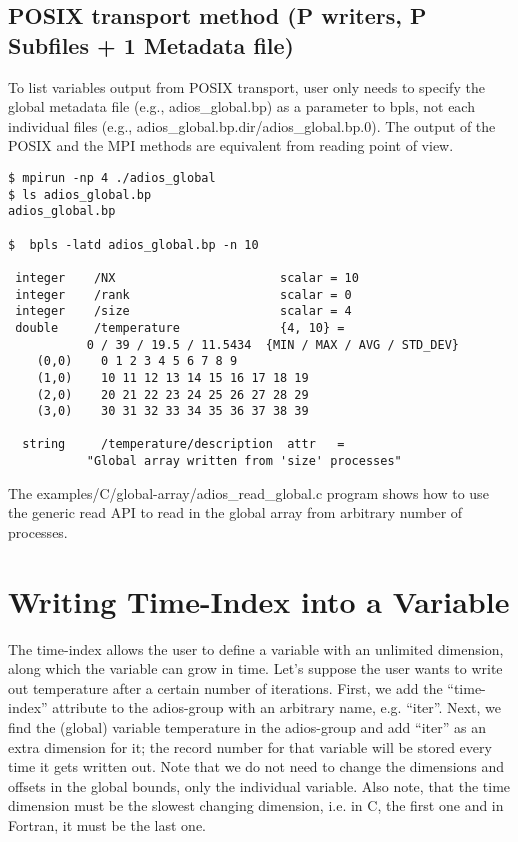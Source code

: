 \subsection{POSIX transport method (P writers, P Subfiles + 1 Metadata file)}

To list variables output from POSIX transport, user only needs to specify the global 
metadata file (e.g., adios\_global.bp) as a parameter to bpls, not each individual 
files (e.g., adios\_global.bp.dir/adios\_global.bp.0). The output of the POSIX 
and the MPI methods are equivalent from reading point of view. 

\begin{lstlisting}
$ mpirun -np 4 ./adios_global
$ ls adios_global.bp 
adios_global.bp

$  bpls -latd adios_global.bp -n 10
  
 integer    /NX                       scalar = 10
 integer    /rank                     scalar = 0
 integer    /size                     scalar = 4
 double     /temperature              {4, 10} = 
           0 / 39 / 19.5 / 11.5434  {MIN / MAX / AVG / STD_DEV}
    (0,0)    0 1 2 3 4 5 6 7 8 9
    (1,0)    10 11 12 13 14 15 16 17 18 19
    (2,0)    20 21 22 23 24 25 26 27 28 29
    (3,0)    30 31 32 33 34 35 36 37 38 39

  string     /temperature/description  attr   = 
           "Global array written from 'size' processes"

\end{lstlisting}

The examples/C/global-array/adios\_read\_global.c program shows how to use the 
generic read API to read in the global array from arbitrary number of processes. 


\section{Writing Time-Index into a Variable}

The time-index allows the user to define a variable with an unlimited dimension, 
along which the variable can grow in time. Let's suppose the user wants to write 
out temperature after a certain number of iterations. First, we add the ``time-index'' 
attribute to the adios-group with an arbitrary name, e.g. ``iter''. Next, we find 
the (global) variable temperature in the adios-group and add ``iter'' as an extra 
dimension for it; the record number for that variable will be stored every time 
it gets written out. Note that we do not need to change the dimensions and offsets 
in the global bounds, only the individual variable. Also note, that the time dimension 
must be the slowest changing dimension, i.e. in C, the first one and in Fortran, 
it must be the last one.

